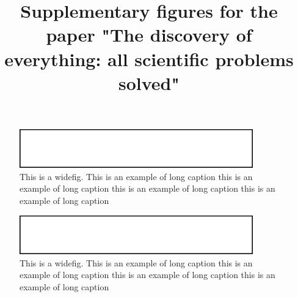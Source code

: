 \documentclass[main.tex]{subfiles}
\begin{document}
\renewcommand{\figurename}{Supplementary Figure}
\renewcommand{\thefigure}{S\arabic{figure}}
\renewcommand{\thepage}{S\arabic{page}}

\renewcommand\floatpagefraction{.001}
\makeatletter
\setlength\@fpsep{\textheight}
\makeatother

\title{Supplementary figures for the paper "The discovery of everything: all scientific problems solved"}
\maketitle

\listoffigures

\afterpage{\clearpage}
\begin{figure}[!p] 
\centering
\includegraphics[width=0.9\textwidth]{fig.eps}
\caption[Part of caption for the list of figures]{This is a widefig. This is an example of long caption this is an example of long caption  this is an example of long caption this is an example of long caption}\label{figS1}
\end{figure}

\afterpage{\clearpage}
\begin{figure}[!p] 
\centering
\includegraphics[width=0.9\textwidth]{fig.eps}
\caption[Main title of the figure]{This is a widefig. This is an example of long caption this is an example of long caption  this is an example of long caption this is an example of long caption}\label{figS2}
\end{figure}
\end{document}
